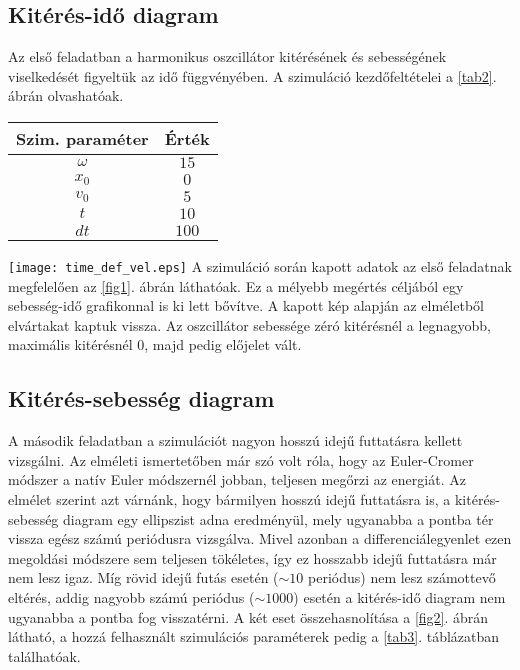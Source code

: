 \begin{multicols}{2}
\subsection{Kitérés-idő diagram}
Az első feladatban a harmonikus oszcillátor kitérésének és sebességének viselkedését figyeltük az idő függvényében. A szimuláció kezdőfeltételei a \ref{tab2}. ábrán olvashatóak.
\begin{center}
\begin{tabular}{c|c}
Szim. paraméter & Érték \\
\hline \hline
$\omega$ & $15$ \\
\hline
$x_{0}$ & $0$ \\
\hline
$v_{0}$ & $5$ \\
\hline
$t$ & $10$ \\
\hline
$dt$ & $100$ \\
\hline
\end{tabular}
\end{center}
\label{tab2}
\hfill \break \hfill \break
{\centering\texttt{[image: time\_def\_vel.eps]}}
\label{fig1}
\hfill \break \hfill \break
A szimuláció során kapott adatok az első feladatnak megfelelően az \ref{fig1}. ábrán láthatóak. Ez a mélyebb megértés céljából egy sebesség-idő grafikonnal is ki lett bővítve. A kapott kép alapján az elméletből elvártakat kaptuk vissza. Az oszcillátor sebessége zéró kitérésnél a legnagyobb, maximális kitérésnél $0$, majd pedig előjelet vált.

\subsection{Kitérés-sebesség diagram}
A második feladatban a szimulációt nagyon hosszú idejű futtatásra kellett vizsgálni. Az elméleti ismertetőben már szó volt róla, hogy az Euler-Cromer módszer a natív Euler módszernél jobban, teljesen megőrzi az energiát. Az elmélet szerint azt várnánk, hogy bármilyen hosszú idejű futtatásra is, a kitérés-sebesség diagram egy ellipszist adna eredményül, mely ugyanabba a pontba tér vissza egész számú periódusra vizsgálva. Mivel azonban a differenciálegyenlet ezen megoldási módszere sem teljesen tökéletes, így ez hosszabb idejű futtatásra már nem lesz igaz. Míg rövid idejű futás esetén ($\sim 10$ periódus) nem lesz számottevő eltérés, addig nagyobb számú periódus ($\sim 1000$) esetén a kitérés-idő diagram nem ugyanabba a pontba fog visszatérni. A két eset összehasnolítása a \ref{fig2}. ábrán látható, a hozzá felhasznált szimulációs paraméterek pedig a \ref{tab3}. táblázatban találhatóak.


\end{multicols}
